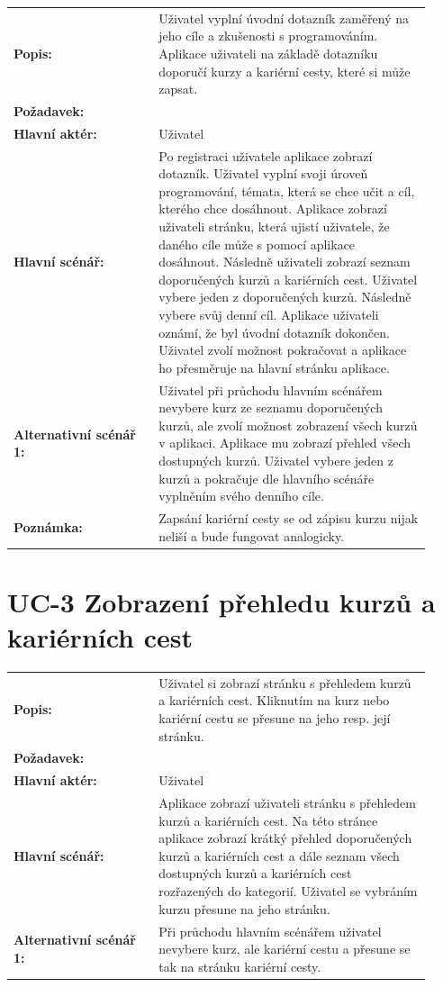 \begin{tabular}{p{0.32\linewidth}p{0.6\linewidth}}
  \textbf{Popis:} & Uživatel vyplní úvodní dotazník zaměřený na jeho cíle a zkušenosti s programováním. Aplikace uživateli na základě dotazníku doporučí kurzy a kariérní cesty, které si může zapsat. \\
  \textbf{Požadavek:} & \nameref{sec:fp-onboarding} \\
  \textbf{Hlavní aktér:} & Uživatel \\
  \textbf{Hlavní scénář:} & Po registraci uživatele aplikace zobrazí dotazník. Uživatel vyplní svoji úroveň programování, témata, která se chce učit a cíl, kterého chce dosáhnout. Aplikace zobrazí uživateli stránku, která ujistí uživatele, že daného cíle může s pomocí aplikace dosáhnout. Následně uživateli zobrazí seznam doporučených kurzů a kariérních cest. Uživatel vybere jeden z doporučených kurzů. Následně vybere svůj denní cíl. Aplikace uživateli oznámí, že byl úvodní dotazník dokončen. Uživatel zvolí možnost pokračovat a aplikace ho přesměruje na hlavní stránku aplikace. \\
  \textbf{Alternativní scénář 1:} & Uživatel při průchodu hlavním scénářem nevybere kurz ze seznamu doporučených kurzů, ale zvolí možnost zobrazení všech kurzů v aplikaci. Aplikace mu zobrazí přehled všech dostupných kurzů. Uživatel vybere jeden z kurzů a pokračuje dle hlavního scénáře vyplněním svého denního cíle. \\
  \textbf{Poznámka:} & Zapsání kariérní cesty se od zápisu kurzu nijak neliší a bude fungovat analogicky. \\
\end{tabular}

\section{UC-3 Zobrazení přehledu kurzů a kariérních cest}\label{sec:uc-3}

\begin{tabular}{p{0.32\linewidth}p{0.6\linewidth}}
  \textbf{Popis:} & Uživatel si zobrazí stránku s přehledem kurzů a kariérních cest. Kliknutím na kurz nebo kariérní cestu se přesune na jeho resp. její stránku. \\
  \textbf{Požadavek:} & \nameref{sec:fp-course-browse} \\
  \textbf{Hlavní aktér:} & Uživatel \\
  \textbf{Hlavní scénář:} & Aplikace zobrazí uživateli stránku s přehledem kurzů a kariérních cest. Na této stránce aplikace zobrazí krátký přehled doporučených kurzů a kariérních cest a dále seznam všech dostupných kurzů a kariérních cest rozřazených do kategorií. Uživatel se vybráním kurzu přesune na jeho stránku. \\
  \textbf{Alternativní scénář 1:} & Při průchodu hlavním scénářem uživatel nevybere kurz, ale kariérní cestu a přesune se tak na stránku kariérní cesty. \\
\end{tabular}


